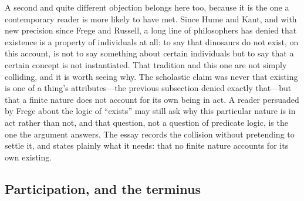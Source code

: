 A second and quite different objection belongs here too, because it is the one a contemporary reader is more likely to have met. Since Hume and Kant, and with new precision since Frege and Russell, a long line of philosophers has denied that existence is a property of individuals at all: to say that dinosaurs do not exist, on this account, is not to say something about certain individuals but to say that a certain concept is not instantiated. That tradition and this one are not simply colliding, and it is worth seeing why. The scholastic claim was never that existing is one of a thing's attributes---the previous subsection denied exactly that---but that a finite nature does not account for its own being in act. A reader persuaded by Frege about the logic of ``exists'' may still ask why this particular nature is in act rather than not, and that question, not a question of predicate logic, is the one the argument answers. The essay records the collision without pretending to settle it, and states plainly what it needs: that no finite nature accounts for its own existing.

\subsection{Participation, and the terminus}

